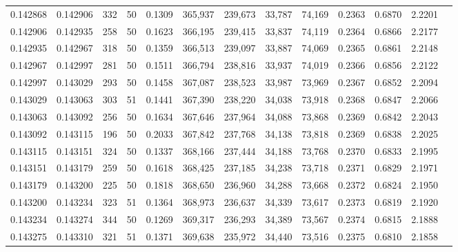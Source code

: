 \begin{tabular}{rrrrrrrrrrrrr}
0.142868 & 0.142906 &   332 &  50 &                                     0.1309 & 365,937 & 239,673 &  33,787 &  74,169 & 0.2363 & 0.6870 & 2.2201 \\
0.142906 & 0.142935 &   258 &  50 &                                     0.1623 & 366,195 & 239,415 &  33,837 &  74,119 & 0.2364 & 0.6866 & 2.2177 \\
0.142935 & 0.142967 &   318 &  50 &                                     0.1359 & 366,513 & 239,097 &  33,887 &  74,069 & 0.2365 & 0.6861 & 2.2148 \\
0.142967 & 0.142997 &   281 &  50 &                                     0.1511 & 366,794 & 238,816 &  33,937 &  74,019 & 0.2366 & 0.6856 & 2.2122 \\
0.142997 & 0.143029 &   293 &  50 &                                     0.1458 & 367,087 & 238,523 &  33,987 &  73,969 & 0.2367 & 0.6852 & 2.2094 \\
0.143029 & 0.143063 &   303 &  51 &                                     0.1441 & 367,390 & 238,220 &  34,038 &  73,918 & 0.2368 & 0.6847 & 2.2066 \\
0.143063 & 0.143092 &   256 &  50 &                                     0.1634 & 367,646 & 237,964 &  34,088 &  73,868 & 0.2369 & 0.6842 & 2.2043 \\
0.143092 & 0.143115 &   196 &  50 &                                     0.2033 & 367,842 & 237,768 &  34,138 &  73,818 & 0.2369 & 0.6838 & 2.2025 \\
0.143115 & 0.143151 &   324 &  50 &                                     0.1337 & 368,166 & 237,444 &  34,188 &  73,768 & 0.2370 & 0.6833 & 2.1995 \\
0.143151 & 0.143179 &   259 &  50 &                                     0.1618 & 368,425 & 237,185 &  34,238 &  73,718 & 0.2371 & 0.6829 & 2.1971 \\
0.143179 & 0.143200 &   225 &  50 &                                     0.1818 & 368,650 & 236,960 &  34,288 &  73,668 & 0.2372 & 0.6824 & 2.1950 \\
0.143200 & 0.143234 &   323 &  51 &                                     0.1364 & 368,973 & 236,637 &  34,339 &  73,617 & 0.2373 & 0.6819 & 2.1920 \\
0.143234 & 0.143274 &   344 &  50 &                                     0.1269 & 369,317 & 236,293 &  34,389 &  73,567 & 0.2374 & 0.6815 & 2.1888 \\
0.143275 & 0.143310 &   321 &  51 &                                     0.1371 & 369,638 & 235,972 &  34,440 &  73,516 & 0.2375 & 0.6810 & 2.1858 \\

\end{tabular}
